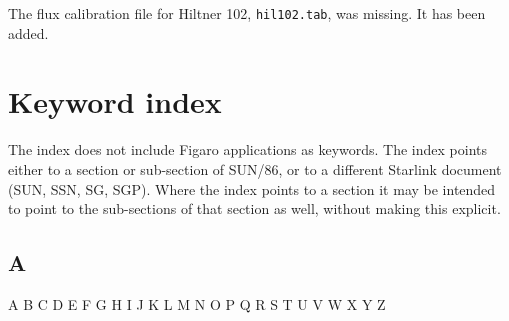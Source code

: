 \documentclass[11pt,twoside]{article}
\newcommand{\stardocinitials}  {SUN}
\newcommand{\stardocnumber}    {86.21}
\newcommand{\stardocname}{\stardocinitials /\stardocnumber}
\newcommand{\htmlref}[2]{#1}
\newcommand{\xlabel}[1]{}
\begin{document}
 The flux calibration file for Hiltner 102, {\tt hil102.tab}, was missing.
 It has been added.



\sloppy\twocolumn
\section{\xlabel{keywords}\label{keywords}Keyword index}
\markboth{Index}{\stardocname}

   The index does not include Figaro applications as keywords.
   The index points either to a section or sub-section of SUN/86, or to
   a different Starlink document (SUN, SSN, SG, SGP). Where the index
   points to a section it may be intended to point to the sub-sections
   of that section as well, without making this explicit.

\small

\subsection*{\label{index_A}A}

\begin{htmlonly}
A
\htmlref{B}{index_B}
\htmlref{C}{index_C}
\htmlref{D}{index_D}
\htmlref{E}{index_E}
\htmlref{F}{index_F}
\htmlref{G}{index_G}
\htmlref{H}{index_H}
\htmlref{I}{index_I}
\htmlref{J}{index_J}
\htmlref{K}{index_K}
\htmlref{L}{index_L}
\htmlref{M}{index_M}
\htmlref{N}{index_N}
\htmlref{O}{index_O}
\htmlref{P}{index_P}
\htmlref{Q}{index_Q}
\htmlref{R}{index_R}
\htmlref{S}{index_S}
\htmlref{T}{index_T}
\htmlref{U}{index_U}
\htmlref{V}{index_V}
\htmlref{W}{index_W}
\htmlref{X}{index_X}
\htmlref{Y}{index_Y}
Z
\end{htmlonly}
\end{document}
